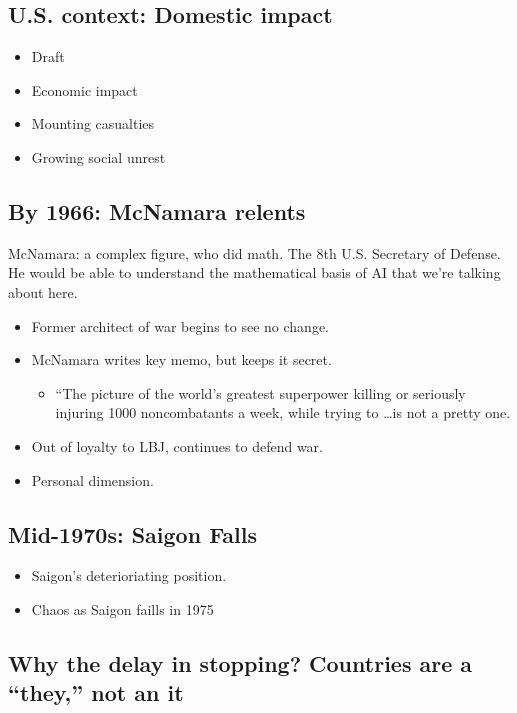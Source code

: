 \documentclass{article}
\begin{document}
\subsection{U.S. context: Domestic impact}
\begin{itemize}
  \item Draft
  \item Economic impact
  \item Mounting casualties
  \item Growing social unrest
\end{itemize}

\subsection{By 1966: McNamara relents}
McNamara: a complex figure, who did math.  The 8th U.S. Secretary of Defense.  He would be able to understand the mathematical basis of AI that we're talking about here.
\begin{itemize}
  \item Former architect of war begins to see no change.
  \item McNamara writes key memo, but keeps it secret.
    \begin{itemize}
      \item ``The picture of the world's greatest superpower killing or seriously injuring 1000 noncombatants a week, while trying to \dots is not a pretty one.
    \end{itemize}
  \item Out of loyalty to LBJ, continues to defend war.
  \item Personal dimension.
\end{itemize}

\subsection{Mid-1970s: Saigon Falls}
\begin{itemize}
  \item Saigon's deterioriating position.
  \item Chaos as Saigon faills in 1975
\end{itemize}

\subsection{Why the delay in stopping? Countries are a ``they,'' not an it}
\end{document}
